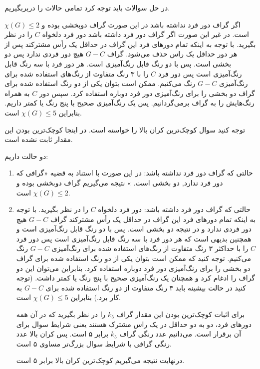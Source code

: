 \documentclass[11pt,largemargins]{h2wp}
\begin{document}
در حل سوالات باید توجه کرد تمامی حالات را دربربگیریم.
 
 
 \solution
 
اگر گراف دور فرد نداشته باشد در این صورت گراف دوبخشی بوده و 
 $\chi (G) \leq 2$
 است.
در غیر این صورت اگر گراف دور فرد داشته باشد
دور فرد دلخواه $C$ را در نظر بگیرید. با توجه به اینکه تمام دورهای فرد این گراف در حداقل یک رأس مشترکند پس از هر دور حداقل یک راس حذف می‌شود. گراف $G-C$ هیچ دور فردی ندارد پس دو بخشی است. پس با دو رنگ قابل رنگ‌آمیزی است. هر دور فرد با سه رنگ قابل رنگ‌آمیزی است پس دور فرد
$C$
را با ۳ رنگ متفاوت از رنگ‌‌های استفاده شده برای رنگ‌آمیزی
$G-C$
رنگ می‌کنیم. ممکن است بتوان یکی از دو رنگ استفاده شده برای گراف دو بخشی را برای رنگ‌آمیزی دور فرد دوباره استفاده کرد. سپس دور $C$ به همراه رنگ‌هایش را به گراف برمی‌گردانیم. پس یک رنگ‌آمیزی صحیح با پنج رنگ یا کمتر داریم. بنابراین 
$ \chi (G) \leq 5 $
است.

\notes

توجه کنید سوال کوچک‌ترین کران بالا را خواسته است. در اینجا کوچک‌ترین بودن این مقدار ثابت نشده است.


دو حالت داریم:
\begin{enumerate}
\item
حالتی که گراف دور فرد نداشته باشد: 
در این صورت با استناد به قضیه «گرافی که دور فرد ندارد, دو بخشی است.
» نتیجه می‌گیریم گراف دوبخشی بوده و 
 $\chi (G) \leq 2$
 است.
\item 
حالتی که گراف دور فرد داشته باشد:
دور فرد دلخواه $C$ را در نظر بگیرید. با توجه به اینکه تمام دورهای فرد این گراف در حداقل یک رأس مشترکند گراف $G-C$ هیچ دور فردی ندارد و در نتیجه دو بخشی است. پس با دو رنگ قابل رنگ‌آمیزی است
و همچنین بدیهی است که هر دور فرد با سه رنگ قابل رنگ‌آمیزی است پس دور فرد
$C$
را با حداکثر ۳ رنگ متفاوت از رنگ‌‌های استفاده شده برای رنگ‌آمیزی
$G-C$
رنگ می‌کنیم.
 توجه کنید که ممکن است بتوان یکی از دو رنگ استفاده شده برای گراف دو بخشی را برای رنگ‌آمیزی دور فرد دوباره استفاده کرد. بنابراین می‌توان این دو گراف را ادغام کرد و همچنان یک رنگ‌آمیزی صحیح با پنج رنگ یا کمتر داشت.
(توجه کنید در حالت بیشینه باید ۳ رنگ متفاوت از دو رنگ استفاده شده برای $G-C$ به کار برد.) بنابراین 
$ \chi (G) \leq 5 $
است.

 
 برای اثبات کوچک‌ترین بودن این مقدار گراف $k_5 $ را در نظر بگیرید که در آن همه دور‌های فرد، دو به دو حداقل در یک راس مشترک هستند یعنی شرایط سوال برای آن برقرار است. می‌دانیم عدد رنگی گراف $k_5 $ برابر ۵ است. پس کران بالا عدد رنگی گرافی با شرایط سوال بزرگ‌تر مساوی ۵ است.
 
 درنهایت نتیجه می‌گیریم کوچک‌ترین کران بالا برابر ۵ است. 
\end{enumerate}
\end{document}

